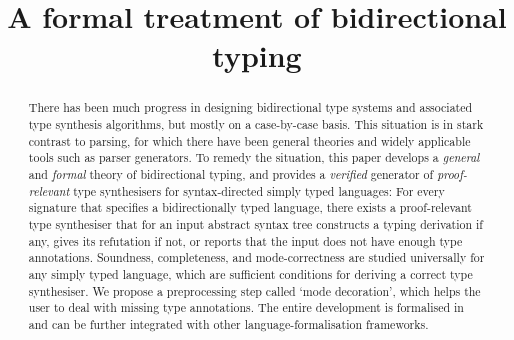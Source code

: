 \documentclass[orivec,envcountsame,envcountsect,envcountreset,oribibl]{llncs}
\title{A formal treatment of bidirectional typing}
\begin{document}
\maketitle

\begin{abstract}
There has been much progress in designing bidirectional type systems and associated type synthesis algorithms, but mostly on a case-by-case basis.
This situation is in stark contrast to parsing, for which there have been general theories and widely applicable tools such as parser generators.
To remedy the situation, this paper develops a \emph{general} and \emph{formal} theory of bidirectional typing, and provides a \emph{verified} generator of \emph{proof-relevant} type synthesisers for syntax-directed simply typed languages: For every signature that specifies a bidirectionally typed language, there exists a proof-relevant type synthesiser that for an input abstract syntax tree constructs a typing derivation if any, gives its refutation if not, or reports that the input does not have enough type annotations.
Soundness, completeness, and mode-correctness are studied universally for any simply typed language, which are sufficient conditions for deriving a correct type synthesiser.
We propose a preprocessing step called `mode decoration', which helps the user to deal with missing type annotations.
The entire development is formalised in \Agda and can be further integrated with other language-formalisation frameworks.
\end{abstract}







%

\appendix
%




\end{document}
